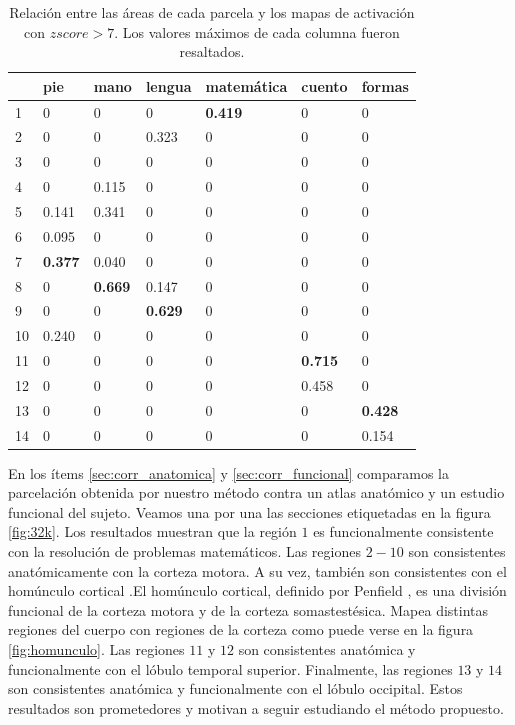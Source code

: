 \begin{table}[]
\centering

\begin{tabular}{|l|l|l|l|l|l|l|}
\hline
   & pie   & mano  & lengua & matemática & cuento & formas \\ \hline
1  & 0     & 0     & 0      & {\bf 0.419} & 0     & 0      \\ \hline
2  & 0     & 0     & 0.323  & 0          & 0      & 0      \\ \hline
3  & 0     & 0     & 0      & 0          & 0      & 0      \\ \hline
4  & 0     & 0.115 & 0      & 0          & 0      & 0      \\ \hline
5  & 0.141 & 0.341 & 0      & 0          & 0      & 0      \\ \hline
6  & 0.095 & 0     & 0      & 0          & 0      & 0      \\ \hline
7  & {\bf 0.377} & 0.040 & 0      & 0          & 0      & 0      \\ \hline
8  & 0     & {\bf 0.669} & 0.147  & 0          & 0      & 0      \\ \hline
9  & 0     & 0     & {\bf 0.629}  & 0          & 0      & 0      \\ \hline
10 & 0.240 & 0     & 0      & 0          & 0      & 0      \\ \hline
11 & 0     & 0     & 0      & 0          & {\bf 0.715}  & 0      \\ \hline
12 & 0     & 0     & 0      & 0          & 0.458  & 0      \\ \hline
13 & 0     & 0     & 0      & 0          & 0      & {\bf 0.428}  \\ \hline
14 & 0     & 0     & 0      & 0          & 0      & 0.154 \\ \hline
\end{tabular}
\caption{Relaci\'on entre las \'areas de cada parcela y los mapas de
         activaci\'on con $zscore > 7$. Los valores m\'aximos de cada 
         columna fueron resaltados.}
\label{tb:zscore7}         
\end{table}

En los \'items \ref{sec:corr_anatomica} y \ref{sec:corr_funcional} 
comparamos la parcelaci\'on obtenida por nuestro m\'etodo contra
un atlas anat\'omico y un estudio funcional del sujeto. Veamos una por 
una las secciones etiquetadas en la figura \ref{fig:32k}. Los resultados
muestran que la regi\'on $1$ es funcionalmente consistente con la 
resoluci\'on de problemas matem\'aticos. Las regiones $2-10$ son consistentes anat\'omicamente con la corteza motora. A su vez, tambi\'en son consistentes con el hom\'unculo cortical .El hom\'unculo cortical,
definido por Penfield \cite{Penfield1954}, es una divisi\'on funcional de
la corteza motora y de la corteza somastest\'esica. Mapea distintas 
regiones del cuerpo con regiones de la corteza como puede verse en la
figura \ref{fig:homunculo}. Las regiones $11$ y $12$ son consistentes 
anat\'omica y funcionalmente con el l\'obulo temporal superior.
Finalmente, las regiones $13$ y $14$ son consistentes anat\'omica y
funcionalmente con el l\'obulo occipital. Estos resultados son prometedores
y motivan a seguir estudiando el m\'etodo propuesto.

